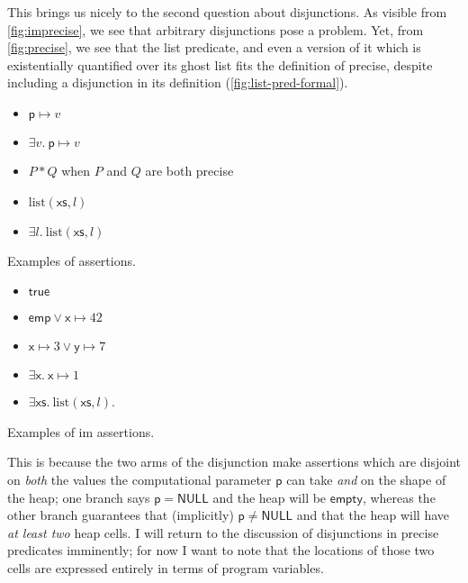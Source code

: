 This brings us nicely to the second question about disjunctions. As visible
from \cref{fig:imprecise}, we see that arbitrary disjunctions pose a problem.
Yet, from \cref{fig:precise}, we see that the list predicate, and even a
version of it which is existentially quantified over its ghost list fits the
definition of precise, despite including a disjunction in its definition
(\cref{fig:list-pred-formal}).

\begin{marginfigure}
\begin{itemize}
    \item $\mathsf{p} \mapsto{} v$
    \item $\exists v.\ \mathsf{p} \mapsto{} v$
    \item $P \ast{} Q$ when $P$ and $Q$ are both precise
    \item $\mathrm{list}(\mathsf{xs}, l)$
    \item $\exists l.\ \mathrm{list}(\mathsf{xs}, l)$
\end{itemize}
\caption{Examples of  assertions.}\label{fig:precise}
\end{marginfigure}

\begin{marginfigure}
\begin{itemize}
    \item $\mathsf{true}$
    \item $\mathsf{emp} \vee{} \mathsf{x} \mapsto{} 42$
    \item $\mathsf{x} \mapsto{} 3 \vee{} \mathsf{y} \mapsto{} 7$
    \item $\exists \mathsf{x}.\ \mathsf{x} \mapsto{} 1$
    \item $\exists \mathsf{xs}.\ \mathrm{list}(\mathsf{xs}, l)$.
\end{itemize}
\caption{Examples of im assertions.}\label{fig:imprecise}
\end{marginfigure}

This is because the two arms of the disjunction make assertions
which are disjoint on \emph{both} the values the computational parameter
$\mathsf{p}$ can take \emph{and} on the shape of the heap; one branch says
$\mathsf{p} = \mathsf{NULL}$ and the heap will be $\mathsf{empty}$, whereas the
other branch guarantees that (implicitly) $\mathsf{p} \neq \mathsf{NULL}$ and
that the heap will have \emph{at least two} heap cells. I will return to the
discussion of disjunctions in precise predicates imminently; for now I want to
note that the locations of those two cells are expressed entirely in terms of
program variables.

